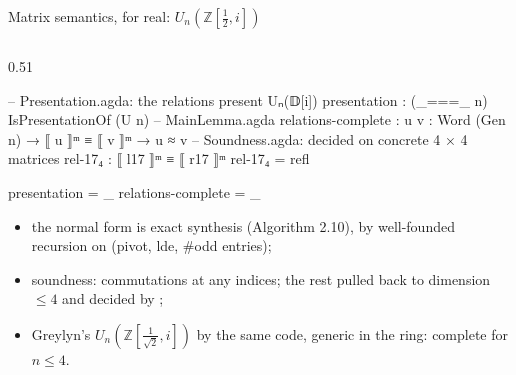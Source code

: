 \begin{frame}{Matrix semantics, for real: $U_n(\mathbb{Z}[\frac12,i])$ \New}
\begin{columns}[c]
\begin{column}{0.51\textwidth}
\begin{code}
  -- Presentation.agda: the relations present Uₙ(𝔻[i])
  presentation : (_===_ {n}) IsPresentationOf (U n)
  -- MainLemma.agda
  relations-complete : {u v : Word (Gen n)} →
                       ⟦ u ⟧ᵐ ≡ ⟦ v ⟧ᵐ → u ≈ v
  -- Soundness.agda: decided on concrete 4 × 4 matrices
  rel-17₄ : ⟦ l17 ⟧ᵐ ≡ ⟦ r17 ⟧ᵐ
  rel-17₄ = refl
\end{code}
\begin{code}[hide]
  presentation = _
  relations-complete = _
\end{code}
\begin{itemize}
  \small
  \item the normal form is \alert{exact synthesis} (Algorithm 2.10), by
        well-founded recursion on (pivot, lde, \#odd entries);
  \item soundness: commutations at any indices; the rest pulled back to
        dimension $\le4$ and decided by ;
  \item Greylyn's $U_n(\mathbb{Z}[\frac1{\sqrt2},i])$ by the same code, generic in
        the ring: complete for $n\le4$.
\end{itemize}
\end{column}
\end{columns}
\end{frame}


